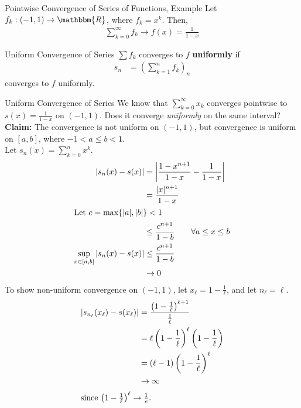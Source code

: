 \documentclass[10pt]{extarticle}
\newcommand{\R}{\mathbbm{R}}
\begin{document}
  \begin{problem}{Pointwise Convergence of Series of Functions, Example}
    Let $f_k: (-1,1) \rightarrow \R$, where $f_k = x^k$. Then,
    \begin{align*}
      \sum_{k=0}^{\infty}f_k \rightarrow f(x) = \frac{1}{1-x}
    \end{align*}
  \end{problem}
  \begin{problem}{Uniform Convergence of Series}
    $\sum f_k$ converges to $f$ \textbf{uniformly} if
    \begin{align*}
      s_n &= \left(\sum_{k=1}^{n} f_k\right)_n
    \end{align*}
    converges to $f$ uniformly.
  \end{problem}
  \begin{problem}{Uniform Convergence of Series}
    We know that $\sum_{k=0}^{\infty} x_k$ converges pointwise to $s(x) = \frac{1}{1-x}$ on $(-1,1)$. Does it converge \textit{uniformly} on the same interval?
    \tcblower
    \textbf{Claim:} The convergence is not uniform on $(-1,1)$, but convergence is uniform on $[a,b]$, where $-1 < a \leq b < 1 $.\\

    Let $s_n(x) = \sum_{k=0}^{n}x^k$.
    \begin{align*}
      |s_n(x) - s(x)| &= \left\vert\frac{1-x^{n+1}}{1-x} - \frac{1}{1-x}\right\vert\\
                      &= \frac{|x|^{n+1}}{1-x}\\
      \shortintertext{Let $c = \max\{|a|,|b|\} < 1$}
                      &\leq \frac{c^{n+1}}{1-b}\tag*{$\forall a \leq x \leq b$}\\
      \sup_{x\in[a,b]}|s_n(x) - s(x)| &\leq \frac{c^{n+1}}{1-b}\\
                                      &\rightarrow 0
    \end{align*}
    To show non-uniform convergence on $(-1,1)$, let $x_{\ell} = 1 - \frac{1}{\ell}$, and let $n_{\ell} = \ell$.
    \begin{align*}
      \left|s_{n_{\ell}}(x_{\ell}) - s(x_{\ell})\right| &= \frac{\left(1-\frac{1}{\ell}\right)^{\ell+1}}{\frac{1}{\ell}}\\
                                                        &= \ell\left(1-\frac{1}{\ell}\right)^{\ell}\left(1-\frac{1}{\ell}\right)\\
                                                        &= (\ell - 1)\left(1-\frac{1}{\ell}\right)^{\ell}\\
                                                        &\rightarrow \infty\\
      \shortintertext{since $\left(1-\frac{1}{\ell}\right)^{\ell}\rightarrow \frac{1}{e}$.}
    \end{align*}
  \end{problem}
\end{document}
